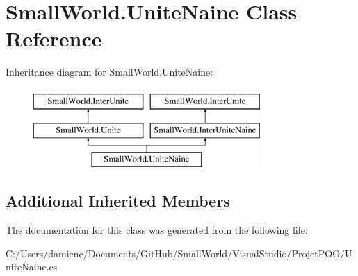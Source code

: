 \hypertarget{class_small_world_1_1_unite_naine}{\section{Small\-World.\-Unite\-Naine Class Reference}
\label{class_small_world_1_1_unite_naine}
}
Inheritance diagram for Small\-World.\-Unite\-Naine\-:\begin{figure}[H]
\begin{center}
\leavevmode
\includegraphics[height=3.000000cm]{class_small_world_1_1_unite_naine}
\end{center}
\end{figure}
\subsection*{Additional Inherited Members}


The documentation for this class was generated from the following file\-:\begin{DoxyCompactItemize}
\item 
C\-:/\-Users/damienc/\-Documents/\-Git\-Hub/\-Small\-World/\-Visual\-Studio/\-Projet\-P\-O\-O/Unite\-Naine.\-cs\end{DoxyCompactItemize}
